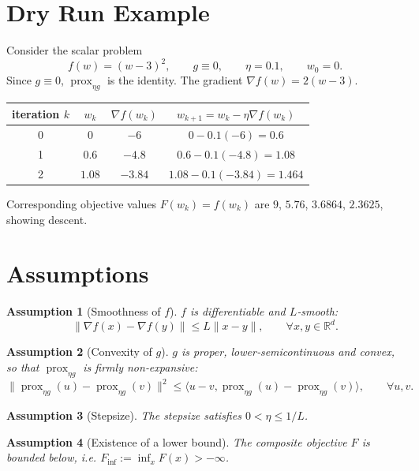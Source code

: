 \documentclass[11pt]{article}
\newtheorem{assumption}{Assumption}
\begin{document}
\section*{Dry Run Example}
Consider the scalar problem
\[
f(w)=(w-3)^{2},\qquad g\equiv0,\qquad \eta=0.1,\qquad w_{0}=0.
\]
Since $g\equiv0$, $\operatorname{prox}_{\eta g}$ is the identity. The gradient $\nabla f(w)=2(w-3)$.

\begin{center}
\begin{tabular}{c|c|c|c}
iteration $k$ & $w_{k}$ & $\nabla f(w_{k})$ & $w_{k+1}=w_{k}-\eta\nabla f(w_{k})$ \\ \hline
0 & $0$ & $-6$ & $0-0.1(-6)=0.6$ \\ 
1 & $0.6$ & $-4.8$ & $0.6-0.1(-4.8)=1.08$ \\ 
2 & $1.08$ & $-3.84$ & $1.08-0.1(-3.84)=1.464$ \\ 
\end{tabular}
\end{center}
Corresponding objective values $F(w_{k})=f(w_{k})$ are $9$, $5.76$, $3.6864$, $2.3625$, showing descent.

\newpage
\section*{Assumptions}
\begin{assumption}[Smoothness of $f$]\label{as:smooth}
$f$ is differentiable and $L$‑smooth:
\[
\|\nabla f(x)-\nabla f(y)\|\le L\|x-y\|,\qquad\forall x,y\in\mathbb{R}^{d}.
\]
\end{assumption}
\begin{assumption}[Convexity of $g$]\label{as:convex}
$g$ is proper, lower‑semicontinuous and convex, so that $\operatorname{prox}_{\eta g}$ is \emph{firmly non‑expansive}:
\[
\|\operatorname{prox}_{\eta g}(u)-\operatorname{prox}_{\eta g}(v)\|^{2}\le\langle u-v,\operatorname{prox}_{\eta g}(u)-\operatorname{prox}_{\eta g}(v)\rangle,\qquad\forall u,v.
\]
\end{assumption}
\begin{assumption}[Stepsize]\label{as:stepsize}
The stepsize satisfies $0<\eta\le 1/L$.
\end{assumption}
\begin{assumption}[Existence of a lower bound]\label{as:bound}
The composite objective $F$ is bounded below, i.e. $F_{\inf}:=\inf_{x}F(x)>-\infty$.
\end{assumption}
\end{document}
